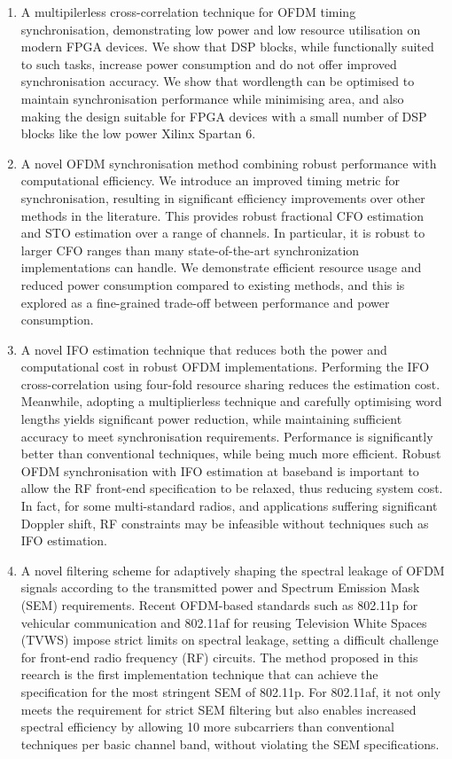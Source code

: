 \begin{enumerate}
\item A multipilerless cross-correlation technique for OFDM timing synchronisation, demonstrating low power and low resource utilisation on modern FPGA devices.
We show that DSP blocks, while functionally suited to such tasks, increase power consumption and do not offer improved synchronisation accuracy.
We show that wordlength can be optimised to maintain synchronisation performance while minimising area, and also making the design suitable for FPGA devices with a small number of DSP blocks like the low power Xilinx Spartan 6.

\item A novel OFDM synchronisation method combining robust performance with computational efficiency.
We introduce an improved timing metric for synchronisation, resulting in significant efficiency improvements over other methods in the literature.
This provides robust fractional CFO estimation and STO estimation over a range of channels.
In particular, it is robust to larger CFO ranges than many state-of-the-art synchronization implementations can handle.
We demonstrate efficient resource usage and reduced power consumption compared to existing methods, and this is explored as a fine-grained trade-off between performance and power consumption.

\item A novel IFO estimation technique that reduces both the power and computational cost in robust OFDM implementations.
Performing the IFO cross-correlation using four-fold resource sharing reduces the estimation cost. Meanwhile, adopting a multiplierless technique and carefully optimising word lengths yields significant power reduction, while maintaining sufficient accuracy to meet synchronisation requirements.
Performance is significantly better than conventional techniques, while being much more efficient.
Robust OFDM synchronisation with IFO estimation at baseband is important to allow the RF front-end specification to be relaxed, thus reducing system cost.
In fact, for some multi-standard radios, and applications suffering significant Doppler shift, RF constraints may be infeasible without techniques such as IFO estimation.

\item A novel filtering scheme for adaptively shaping the spectral leakage of OFDM signals according to the transmitted power and Spectrum Emission Mask (SEM) requirements.
Recent OFDM-based standards such as 802.11p for vehicular communication and 802.11af for reusing Television White Spaces (TVWS) impose strict limits on spectral leakage, setting a difficult challenge for front-end radio frequency (RF) circuits.
The method proposed in this reearch is the first implementation technique that can achieve the specification for the most stringent SEM of 802.11p.
For 802.11af, it not only meets the requirement for strict SEM filtering but also enables increased spectral efficiency by allowing 10 more subcarriers than conventional techniques per basic channel band, without violating the SEM specifications.


\end{enumerate}
